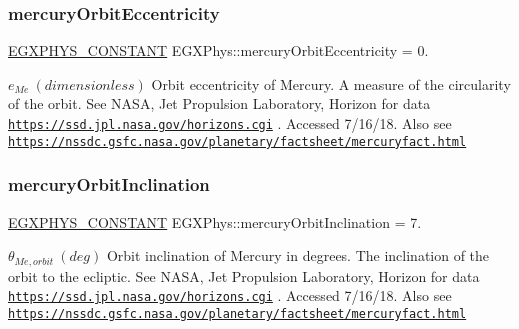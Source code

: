 \subsubsection{\texorpdfstring{mercury\+Orbit\+Eccentricity}{mercuryOrbitEccentricity}}
{\footnotesize\ttfamily \mbox{\hyperlink{group___e_g_x_phys-_constants-_macros_ga76980d288494ce1714c9ac68a95ba702}{E\+G\+X\+P\+H\+Y\+S\+\_\+\+C\+O\+N\+S\+T\+A\+NT}} E\+G\+X\+Phys\+::mercury\+Orbit\+Eccentricity = 0.}

$ e_{Me} \ (dimensionless)$ Orbit eccentricity of Mercury. A measure of the circularity of the orbit. See N\+A\+SA, Jet Propulsion Laboratory, Horizon for data \href{https://ssd.jpl.nasa.gov/horizons.cgi}{\tt https\+://ssd.\+jpl.\+nasa.\+gov/horizons.\+cgi} . Accessed 7/16/18. Also see \href{https://nssdc.gsfc.nasa.gov/planetary/factsheet/mercuryfact.html}{\tt https\+://nssdc.\+gsfc.\+nasa.\+gov/planetary/factsheet/mercuryfact.\+html} \mbox{\label{group___e_g_x_phys-_constants-_astrophysics-_solar_system-_mercury-_orbit_ga58319d10bf99a7f9e02d58440f1e5e91}} 
\subsubsection{\texorpdfstring{mercury\+Orbit\+Inclination}{mercuryOrbitInclination}}
{\footnotesize\ttfamily \mbox{\hyperlink{group___e_g_x_phys-_constants-_macros_ga76980d288494ce1714c9ac68a95ba702}{E\+G\+X\+P\+H\+Y\+S\+\_\+\+C\+O\+N\+S\+T\+A\+NT}} E\+G\+X\+Phys\+::mercury\+Orbit\+Inclination = 7.}

$ \theta_{Me,orbit} \ (deg)$ Orbit inclination of Mercury in degrees. The inclination of the orbit to the ecliptic. See N\+A\+SA, Jet Propulsion Laboratory, Horizon for data \href{https://ssd.jpl.nasa.gov/horizons.cgi}{\tt https\+://ssd.\+jpl.\+nasa.\+gov/horizons.\+cgi} . Accessed 7/16/18. Also see \href{https://nssdc.gsfc.nasa.gov/planetary/factsheet/mercuryfact.html}{\tt https\+://nssdc.\+gsfc.\+nasa.\+gov/planetary/factsheet/mercuryfact.\+html} \mbox{\label{group___e_g_x_phys-_constants-_astrophysics-_solar_system-_mercury-_orbit_ga6aff57e13acffaffc3cfe97694da2363}} 
